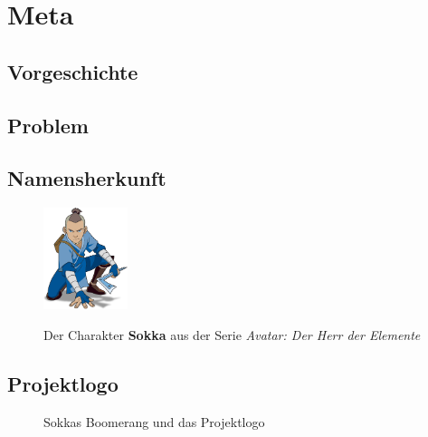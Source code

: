 \chapter{Meta}

\section{Vorgeschichte}

\section{Problem}

\section{Namensherkunft}


\begin{figure}[H]
    \begin{center}
        \includegraphics[width=0.22\textwidth]{images/Intro/Sokka.png}
        \caption{Der Charakter \textbf{Sokka} aus der Serie \textit{Avatar: Der Herr der Elemente}}
        \cite{nickelodeon2005}
    \end{center}
\end{figure}

\newpage

\section{Projektlogo}


\begin{figure}[H]
    \centering
    \hfill
    \hfill
    \hfill
    \caption{Sokkas Boomerang und das Projektlogo}
\end{figure}